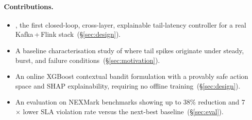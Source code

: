 \paragraph{Contributions.}
\begin{itemize}
  \item \xtal, the first closed-loop, cross-layer, explainable
    tail-latency controller for a real Kafka\,+\,Flink stack~(\S\ref{sec:design}).
  \item A baseline characterisation study of where tail spikes originate
    under steady, burst, and failure conditions~(\S\ref{sec:motivation}).
  \item An online XGBoost contextual bandit formulation with a provably
    safe action space and SHAP explainability, requiring no offline
    training~(\S\ref{sec:design}).
  \item An evaluation on NEXMark benchmarks showing up to 38\% 
    reduction and 7$\times$ lower SLA violation rate versus the
    next-best baseline~(\S\ref{sec:eval}).
\end{itemize}
